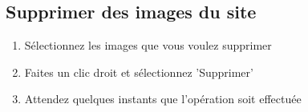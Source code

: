 \documentclass[10pt,a4paper]{article}
\begin{document}
\subsection{Supprimer des images du site}
\begin{enumerate}
\item Sélectionnez les images que vous voulez supprimer
\item Faites un clic droit et sélectionnez 'Supprimer'
\item Attendez quelques instants que l'opération soit effectuée
\end{enumerate}
\end{document}
